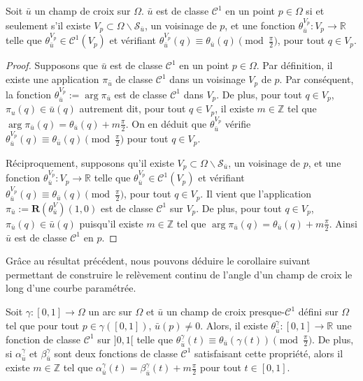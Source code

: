 \begin{proposition}
    \label{prop:angular_cont}
    Soit $\bar{u}$ un champ de croix sur $\Omega$. $\bar{u}$ est de classe $\mathcal{C}^1$ en un point $p\in\Omega$ si et seulement s'il existe $V_p\subset \Omega \backslash \mathcal{S}_{\bar{u}}$, un voisinage de $p$, et une fonction $\theta_{\bar{u}}^{V_p}:V_p \rightarrow \mathbb{R}$ telle que $\theta_{\bar{u}}^{V_p}\in \mathcal{C}^1(V_p)$ et vérifiant $\theta_{\bar{u}}^{V_p}(q)\equiv\theta_{\bar{u}}(q) \pmod{\frac{\pi}{2}}$, pour tout $q\in V_p$.
\end{proposition}


\begin{proof}
    Supposons que $\bar{u}$ est de classe $\mathcal{C}^1$ en un point $p\in\Omega$. Par définition, il existe une application $\pi_{\bar{u}}$ de classe $\mathcal{C}^1$ dans un voisinage $V_p$ de $p$. Par conséquent, la fonction $\theta_{\bar{u}}^{V_p}:=\arg \pi_{\bar{u}}$ est de classe $\mathcal{C}^1$ dans $V_p$. De plus, pour tout $q\in V_p$, $\pi_u(q)\in\bar{u}(q)$ autrement dit, pour tout $q\in V_p$, il existe $m\in\mathbb{Z}$ tel que $\arg\pi_{\bar{u}}(q)=\theta_{\bar{u}}(q)+m\frac{\pi}{2}$. On en déduit que $\theta_{\bar{u}}^{V_p}$ vérifie $\theta^{V_p}_{\bar{u}}(q)\equiv\theta_{\bar{u}}(q)\pmod{\frac{\pi}{2}}$ pour tout $q\in V_p$.

    Réciproquement, supposons qu'il existe $V_p\subset \Omega \backslash \mathcal{S}_{\bar{u}}$, un voisinage de $p$, et une fonction $\theta_{\bar{u}}^{V_p}:V_p \rightarrow \mathbb{R}$ telle que $\theta_{\bar{u}}^{V_p}\in \mathcal{C}^1(V_p)$ et vérifiant $\theta_{\bar{u}}^{V_p}(q)\equiv\theta_{\bar{u}}(q) \pmod{\frac{\pi}{2}}$, pour tout $q\in V_p$. Il vient que l'application $\pi_{\bar{u}}:=\mathbf{R}(\theta_{\bar{u}}^V)(1,0)$ est de classe $\mathcal{C}^1$ sur $V_p$. De plus, pour tout $q\in V_p$, $\pi_{\bar{u}}(q)\in \bar{u}(q)$ puisqu'il existe $m\in\mathbb{Z}$ tel que $\arg\pi_{\bar{u}}(q)=\theta_{\bar{u}}(q)+m\frac{\pi}{2}$. Ainsi $\bar{u}$ est de classe $\mathcal{C}^1$ en $p$.
\end{proof}


Grâce au résultat précédent, nous pouvons déduire le corollaire suivant permettant de construire le relèvement continu de l'angle d'un champ de croix le long d'une courbe paramétrée.

\begin{corollary}
    \label{cor:relevement_continu}
    Soit $\gamma: [0, 1] \longrightarrow \Omega$ un arc sur $\Omega$ et $\bar{u}$ un champ de croix presque-$\mathcal{C}^1$ défini sur $\Omega$ tel que pour tout $p\in\gamma([0, 1])$, $\bar{u}(p)\neq 0$. Alors, il existe $\theta^\gamma_{\bar{u}}: [0, 1] \longrightarrow \mathbb{R}$  une fonction de classe $\mathcal{C}^1$ sur $]0,1[$ telle que $\theta^\gamma_{\bar{u}}(t) \equiv \theta_{\bar{u}}(\gamma(t)) \pmod{\frac{\pi}{2}}$. De plus, si $\alpha_{\bar{u}}^\gamma$ et $\beta_{\bar{u}}^\gamma$ sont deux fonctions de classe $\mathcal{C}^1$ satisfaisant cette propriété, alors il existe $m \in \mathbb{Z}$ tel que $\alpha_{\bar{u}}^\gamma(t) = \beta_{\bar{u}}^\gamma(t) + m\frac{\pi}{2}$ pour tout $t \in [0, 1]$.
\end{corollary}

